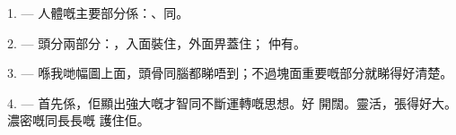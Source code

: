 %
%
%
%
%
%

\VUsaut{4.0mm}
\VUsaut{2.0mm}

\VUsaut{2.4mm}
\VUsaut{3.0mm}

\VUsaut{3.0mm}

1. --- 人體嘅主要部分係：、同。

2. --- 頭分兩部分：，入面裝住，外面畀蓋住；
仲有。

3. --- 喺我哋幅圖上面，頭骨同腦都睇唔到；不過塊面重要嘅部分就睇得好清楚。

4. --- 首先係，佢顯出強大嘅才智同不斷運轉嘅思想。好
開闊。靈活，張得好大。濃密嘅同長長嘅
護住佢。

